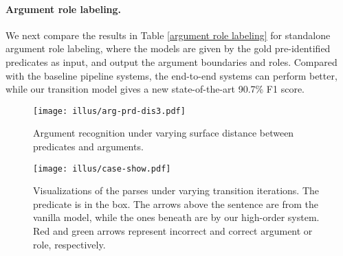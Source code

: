 \documentclass[letterpaper]{article} \usepackage{aaai21}  \usepackage{times}  \usepackage{helvet} \usepackage{courier}  \usepackage[hyphens]{url}  \usepackage{graphicx} \urlstyle{rm} \def\UrlFont{\rm}  \usepackage{natbib}  \usepackage{caption}
\begin{document}
\begin{CJK}{UTF8}{gbsn}
\paragraph{Argument role labeling.}

We next compare the results in Table \ref{argument role labeling} for standalone argument role labeling, where the models are given by the gold pre-identified predicates as input,
and output the argument boundaries and roles.
Compared with the baseline pipeline systems, the end-to-end systems can perform better, while our transition model gives a new state-of-the-art 90.7\% F1 score.






\begin{figure}[!t]
\centering \texttt{[image: illus/arg-prd-dis3.pdf]}
\caption{
Argument recognition under varying surface distance between predicates and arguments.
}
\label{distance}
\end{figure}







\begin{table}[!t]
\begin{center}
\end{center}
\caption{
  Results with contextualized word representation.
  }
  \label{LM}
\end{table}


\begin{figure}[!t]
\centering \texttt{[image: illus/case-show.pdf]}
\caption{
Visualizations of the parses under varying transition iterations.
The predicate is in the box.
The arrows above the sentence are from the vanilla model, while the ones beneath are by our high-order system.
Red and green arrows represent incorrect and correct argument or role, respectively.
}
\label{case}
\end{figure}







\end{CJK}
\end{document}
